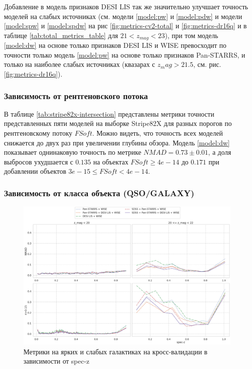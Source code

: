 \documentclass[fleqn,usenatbib]{mnras}
\begin{document}
Добавление в модель признаков DESI LIS так же значительно улучшает точность моделей на слабых источниках (см. модели \ref{model:pw} и \ref{model:pdw} и модели \ref{model:spw} и \ref{model:spdw} на рис \ref{fig:metrics-cv2-total} и \ref{fig:metrics-dr16q} и в таблице \ref{tab:total_metrics_table} для $21 < z_{mag} < 23$), при том модель \ref{model:dw} на основе только признаков DESI LIS и WISE превосходит по точности только модель \ref{model:pw} на основе только признаков Pan-STARRS, и только на наиболее слабых источниках (квазарах с $z_mag > 21.5$, см. рис. \ref{fig:metrics-dr16q}).

\subsubsection{Зависимость от рентгеновского потока}\label{ssec:accuracy-as-ffx}

В таблице \ref{tab:stripe82x-intersection} представлены метрики точности представленных пяти моделей на выборке Stripe82X для разных порогов по рентгеновскому потоку $FSoft$. Можно видеть, что точность всех моделей снижается до двух раз при увеличении глубины обзора. Модель \ref{model:dw} показывает однинаковую точность по метрике $NMAD = 0.73 \pm 0.01$, а доля выбросов ухудшается с $0.135$ на объектах $FSoft \geq 4e-14$ до $0.171$ при добавлении объектов $3e-15 \leq FSoft < 4e-14$.

\subsubsection{Зависимость от класса объекта (QSO/GALAXY)}
\begin{figure}
    \centering
    \includegraphics[width=0.99\linewidth]{images/class-galaxy-cv2.png}
    \caption{Метрики на ярких и слабых галактиках на кросс-валидации в зависимости от spec-z}
    \label{fig:class-galaxy-cv2}
\end{figure}
\end{document}
